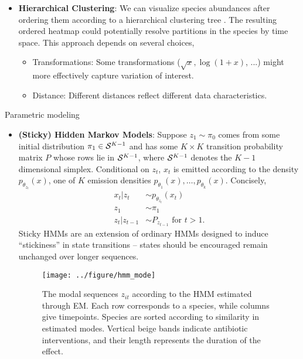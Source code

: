 \documentclass[final, 8pt]{beamer}
\newlength{\onecolwid}
\begin{document}
\begin{frame}
\begin{columns}
\begin{column}{\onecolwid}
\begin{block}{}
\begin{itemize}
\item \textbf{Hierarchical Clustering}: We can visualize species abundances after
  ordering them according to a hierarchical clustering tree
  \citep{johnson1967hierarchical}. The resulting ordered heatmap could
  potentially resolve partitions in the species by time space. This approach
  depends on several choices,
  \begin{itemize}
  \item Transformations: Some transformations ($\sqrt{x}, \log\left(1 +
    x\right)$, ...) might more effectively capture variation of interest.
  \item Distance: Different distances reflect different data characteristics.
\end{itemize}
\end{itemize}
\end{block}

\begin{block}{Parametric modeling}
\begin{itemize}
\item \textbf{(Sticky) Hidden Markov Models}: Suppose $z_{1} \sim
  \pi_{0}$ comes from some initial distribution $\pi_{1} \in \mathcal{S}^{K - 1}$
  and has some $K \times K$ transition probability matrix $P$ whose rows lie in
  $\mathcal{S}^{K - 1}$, where $\mathcal{S}^{K - 1}$ denotes the $K - 1$ dimensional
  simplex. Conditional on $z_{t}$, $x_{t}$ is emitted according to the density
  $p_{\theta_{z_{t}}}\left(x\right)$, one of $K$ emission densities
  $p_{\theta_{1}}\left(x\right), \dots, p_{\theta_{k}}\left(x\right)$.
  Concisely,
\begin{align*}
  x_{t} \vert z_{t} &\sim p_{\theta_{z_{t}}}\left(x_{t}\right) \\
  z_{1} &\sim \pi_{1} \\
  z_{t} \vert z_{t - 1} &\sim P_{z_{t - 1}} \text{ for } t > 1.
\end{align*}
Sticky HMMs are an extension of ordinary HMMs designed to induce ``stickiness''
in state transitions -- states should be encouraged remain unchanged over longer
sequences.
\begin{figure}[ht]
  \centering
  \texttt{[image: ../figure/hmm\_mode]}
  \caption{The modal sequences $z_{it}$ according to the HMM estimated through
    EM. Each row corresponds to a species, while columns give timepoints.
    Species are sorted according to similarity in estimated modes. Vertical
    beige bands indicate antibiotic interventions, and their length represents
    the duration of the effect.\label{fig:hmm_mode} }
\end{figure}


\end{itemize}
\end{block}
\end{column}
\end{columns}
\end{frame}
\end{document}
